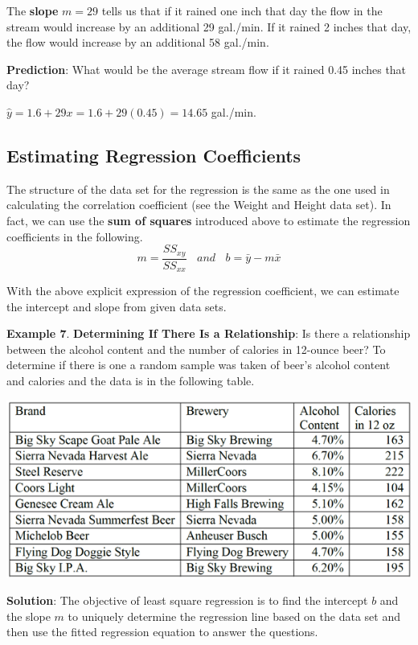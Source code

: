 \documentclass[
]{book}
\begin{document}
The \textbf{slope} \(m = 29\) tells us that if it rained one inch that day the flow in the stream would increase by an additional 29 gal./min. If it rained 2 inches that day, the flow would increase by an additional 58 gal./min.

\textbf{Prediction}: What would be the average stream flow if it rained 0.45 inches that day?

\(\hat{y} = 1.6 + 29x = 1.6 + 29(0.45) =14.65\) gal./min.

\hypertarget{estimating-regression-coefficients}{%
\subsection{Estimating Regression Coefficients}\label{estimating-regression-coefficients}}

The structure of the data set for the regression is the same as the one used in calculating the correlation coefficient (see the Weight and Height data set). In fact, we can use the \textbf{sum of squares} introduced above to estimate the regression coefficients in the following.
\[
m = \frac{SS_{xy}}{SS_{xx}}  \ \ \ \  and \ \ \ \ b = \bar{y} - m \bar{x}
\]

With the above explicit expression of the regression coefficient, we can estimate the intercept and slope from given data sets.

\textbf{Example 7}. \textbf{Determining If There Is a Relationship}: Is there a relationship between the alcohol content and the number of calories in 12-ounce beer? To determine if there is one a random sample was taken of beer's alcohol content and calories and the data is in the following table.

\begin{center}\includegraphics[width=0.6\linewidth]{week12/example07Data} \end{center}

\textbf{Solution}: The objective of least square regression is to find the intercept \(b\) and the slope \(m\) to uniquely determine the regression line based on the data set and then use the fitted regression equation to answer the questions.
\end{document}

